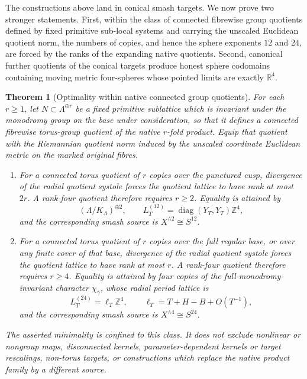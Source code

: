 \documentclass[11pt,letterpaper]{article}
\numberwithin{equation}{section}
\newtheorem{theorem}{Theorem}[section]
\theoremstyle{definition}
\theoremstyle{remark}
\newcommand{\R}{\mathbb R}
\newcommand{\Z}{\mathbb Z}
\begin{document}
The constructions above land in conical smash targets.  We now prove two
stronger statements.  First, within the class of connected fibrewise group
quotients defined by fixed primitive sub-local systems and carrying the
unscaled Euclidean quotient norm, the numbers of copies, and hence the
sphere exponents \(12\) and \(24\), are forced by the ranks of the
expanding native quotients.  Second, canonical further quotients of the conical
targets produce honest sphere codomains containing moving metric
four-spheres whose pointed limits are exactly \(\R^4\).

\begin{theorem}[Optimality within native connected group quotients]
\label{thm:optimal-exponents}
For each \(r\geq1\), let
\(N\subset\Lambda^{\oplus r}\) be a fixed primitive sublattice which is
invariant under the monodromy group on the base under consideration, so
that it defines a connected fibrewise torus-group quotient of the native
\(r\)-fold product.  Equip that quotient with the Riemannian quotient norm
induced by the unscaled coordinate Euclidean metric on the marked original
fibres.
\begin{enumerate}[label=\textup{(\roman*)}]
\item For a connected torus quotient of \(r\) copies over the punctured
cusp, divergence of the radial quotient systole forces the quotient
lattice to have rank at most \(2r\).  A rank-four quotient therefore
requires \(r\geq2\).  Equality is attained by
\begin{equation}
 (\Lambda/K_\Lambda)^{\oplus2},
 \qquad
 L_T^{(12)}=\operatorname{diag}(Y_T,Y_T)\Z^4,
 \label{eq:S12-optimal-lattice}
\end{equation}
and the corresponding smash source is
\(X^{\wedge2}\cong S^{12}\).

\item For a connected torus quotient of \(r\) copies over the full regular
base, or over any finite cover of that base, divergence of the radial
quotient systole forces the quotient lattice to have rank at most \(r\).
A rank-four quotient therefore requires \(r\geq4\).  Equality is attained
by four copies of the full-monodromy-invariant character
\(\chi_\gamma\), whose radial period lattice is
\begin{equation}
 L_T^{(24)}=\ell_T\Z^4,\qquad
 \ell_T=T+H-B+O(T^{-1}),
 \label{eq:S24-optimal-lattice}
\end{equation}
 and the corresponding smash source is
 \(X^{\wedge4}\cong S^{24}\).
\end{enumerate}
The asserted minimality is confined to this class.  It does not exclude
nonlinear or nongroup maps, disconnected kernels, parameter-dependent
kernels or target rescalings, non-torus targets, or constructions which
replace the native product family by a different source.
\end{theorem}
\end{document}

